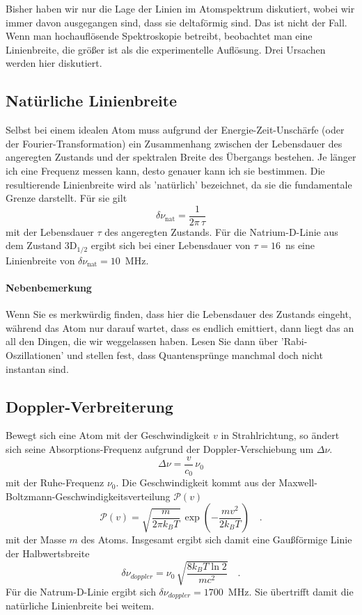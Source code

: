 Bisher haben wir nur die Lage der Linien im Atomspektrum diskutiert, wobei wir immer davon ausgegangen sind, dass sie deltaförmig sind. Das ist nicht der Fall. Wenn man hochauflösende Spektroskopie betreibt, beobachtet man eine Linienbreite, die größer ist als die experimentelle Auflösung. Drei Ursachen werden hier diskutiert.

\subsection{Natürliche Linienbreite} 

Selbst bei einem idealen Atom muss aufgrund der Energie-Zeit-Unschärfe (oder der Fourier-Transformation) ein Zusammenhang zwischen der Lebensdauer des angeregten Zustands und der spektralen Breite des Übergangs bestehen. Je länger ich eine Frequenz messen kann, desto genauer kann ich sie bestimmen. Die resultierende Linienbreite wird als 'natürlich' bezeichnet, da sie die fundamentale Grenze darstellt. Für sie gilt
\begin{equation}
    \delta \nu_\text{nat} = \frac{1}{2\pi \, \tau}
\end{equation}
mit der Lebensdauer $\tau$ des angeregten Zustands. Für die Natrium-D-Linie aus dem Zustand 3D$_{1/2}$ ergibt sich bei einer Lebensdauer von $\tau = 16$~ns eine Linienbreite von $\delta \nu_\text{nat} = 10$~MHz.

\paragraph{Nebenbemerkung} Wenn Sie es merkwürdig finden, dass hier die Lebensdauer des Zustands eingeht, während das Atom nur darauf wartet, dass es endlich emittiert, dann liegt das an all den Dingen, die wir weggelassen haben. Lesen Sie dann über  'Rabi-Oszillationen' und stellen fest, dass Quantensprünge manchmal doch nicht instantan sind.


\subsection{Doppler-Verbreiterung}


Bewegt sich eine Atom mit der Geschwindigkeit  $v$ in Strahlrichtung, so ändert sich seine Absorptions-Frequenz aufgrund der Doppler-Verschiebung um $\Delta \nu$.
\begin{equation}
	\Delta \nu = \frac{v}{c_0} \, \nu_0
\end{equation}
mit der Ruhe-Frequenz $\nu_0$. Die Geschwindigkeit kommt  aus der  Maxwell-Boltzmann-Geschwindigkeitsverteilung $\mathcal{P}(v)$
\begin{equation}
	\mathcal{P}(v) = \sqrt{\frac{m}{2 \pi k_B T}} \, \exp \left (
	- \frac{m v^2}{2  k_B T}	
	\right) \quad .
\end{equation}
mit der Masse $m$ des Atoms.
Insgesamt ergibt sich damit eine Gaußförmige  Linie der Halbwertsbreite 
\begin{equation}
	 \delta \nu_{doppler} = \nu_0 \, \sqrt{\frac{8 k_B T \ln 2} {m c^2}} \quad .
\end{equation}
Für die Natrum-D-Linie ergibt sich  $\delta \nu_{doppler} = 1 700$~MHz. Sie übertrifft damit die natürliche Linienbreite bei weitem.

